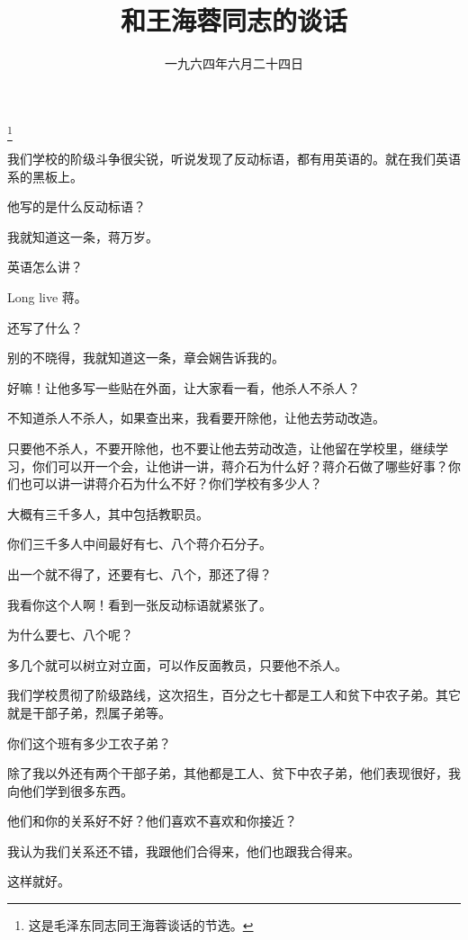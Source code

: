 
\title{和王海蓉同志的谈话}
\date{一九六四年六月二十四日}
\thanks{这是毛泽东同志同王海蓉谈话的节选。}
\maketitle


我们学校的阶级斗争很尖锐，听说发现了反动标语，都有用英语的。就在我们英语系的黑板上。

他写的是什么反动标语？

我就知道这一条，蒋万岁。

英语怎么讲？

Long live 蒋。

还写了什么？

别的不晓得，我就知道这一条，章会娴告诉我的。

好嘛！让他多写一些贴在外面，让大家看一看，他杀人不杀人？

不知道杀人不杀人，如果查出来，我看要开除他，让他去劳动改造。

只要他不杀人，不要开除他，也不要让他去劳动改造，让他留在学校里，继续学习，你们可以开一个会，让他讲一讲，蒋介石为什么好？蒋介石做了哪些好事？你们也可以讲一讲蒋介石为什么不好？你们学校有多少人？

大概有三千多人，其中包括教职员。

你们三千多人中间最好有七、八个蒋介石分子。

出一个就不得了，还要有七、八个，那还了得？

我看你这个人啊！看到一张反动标语就紧张了。

为什么要七、八个呢？

多几个就可以树立对立面，可以作反面教员，只要他不杀人。

我们学校贯彻了阶级路线，这次招生，百分之七十都是工人和贫下中农子弟。其它就是干部子弟，烈属子弟等。

你们这个班有多少工农子弟？

除了我以外还有两个干部子弟，其他都是工人、贫下中农子弟，他们表现很好，我向他们学到很多东西。

他们和你的关系好不好？他们喜欢不喜欢和你接近？

我认为我们关系还不错，我跟他们合得来，他们也跟我合得来。

这样就好。

